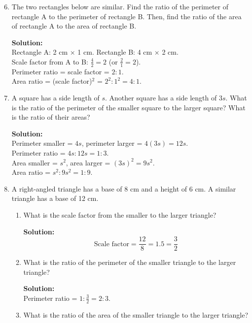 \documentclass[12pt,a4paper]{article}
\begin{document}
\begin{enumerate}
\setcounter{enumi}{5}

\item The two rectangles below are similar. Find the ratio of the perimeter of rectangle A to the perimeter of rectangle B. Then, find the ratio of the area of rectangle A to the area of rectangle B.

\textbf{Solution:}\\
Rectangle A: 2 cm × 1 cm. Rectangle B: 4 cm × 2 cm.\\
Scale factor from A to B: \( \frac{4}{2} = 2 \) (or \( \frac{2}{1} = 2 \)).\\
Perimeter ratio = scale factor = \( 2:1 \).\\
Area ratio = (scale factor)\(^2\) = \( 2^2:1^2 = 4:1 \).

\item A square has a side length of \( s \). Another square has a side length of \( 3s \). What is the ratio of the perimeter of the smaller square to the larger square? What is the ratio of their areas?

\textbf{Solution:}\\
Perimeter smaller = \( 4s \), perimeter larger = \( 4(3s) = 12s \).\\
Perimeter ratio = \( 4s : 12s = 1:3 \).\\
Area smaller = \( s^2 \), area larger = \( (3s)^2 = 9s^2 \).\\
Area ratio = \( s^2 : 9s^2 = 1:9 \).

\item A right-angled triangle has a base of 8 cm and a height of 6 cm. A similar triangle has a base of 12 cm.
    \begin{enumerate}
    \item What is the scale factor from the smaller to the larger triangle?
    
    \textbf{Solution:}
    \[
    \text{Scale factor} = \frac{12}{8} = 1.5 = \frac{3}{2}
    \]
    
    \item What is the ratio of the perimeter of the smaller triangle to the larger triangle?
    
    \textbf{Solution:}\\
    Perimeter ratio = \( 1 : \frac{3}{2} = 2:3 \).
    
    \item What is the ratio of the area of the smaller triangle to the larger triangle?
    

\end{enumerate}
\end{enumerate}
\end{document}
